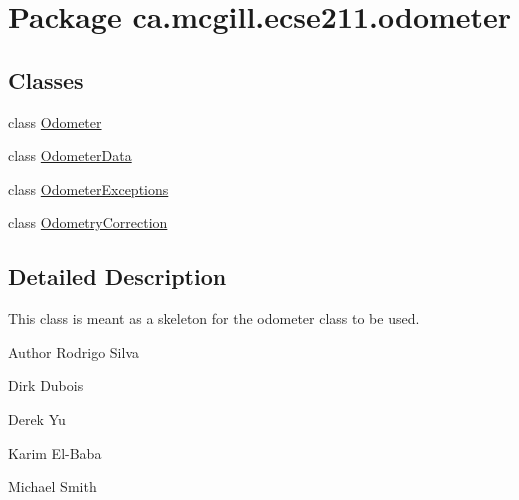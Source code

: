 \hypertarget{namespaceca_1_1mcgill_1_1ecse211_1_1odometer}{}\section{Package ca.\+mcgill.\+ecse211.\+odometer}
\label{namespaceca_1_1mcgill_1_1ecse211_1_1odometer}
\subsection*{Classes}
\begin{DoxyCompactItemize}
\item 
class \hyperlink{classca_1_1mcgill_1_1ecse211_1_1odometer_1_1_odometer}{Odometer}
\item 
class \hyperlink{classca_1_1mcgill_1_1ecse211_1_1odometer_1_1_odometer_data}{Odometer\+Data}
\item 
class \hyperlink{classca_1_1mcgill_1_1ecse211_1_1odometer_1_1_odometer_exceptions}{Odometer\+Exceptions}
\item 
class \hyperlink{classca_1_1mcgill_1_1ecse211_1_1odometer_1_1_odometry_correction}{Odometry\+Correction}
\end{DoxyCompactItemize}


\subsection{Detailed Description}
This class is meant as a skeleton for the odometer class to be used.

\begin{DoxyAuthor}{Author}
Rodrigo Silva 

Dirk Dubois 

Derek Yu 

Karim El-\/\+Baba 

Michael Smith 
\end{DoxyAuthor}
